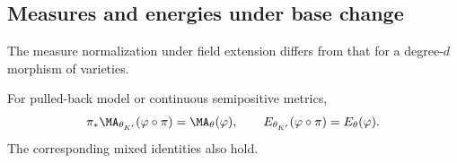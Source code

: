 \subsection{Measures and energies under base change}
\label{sec:ch30-bc-measures}

The measure normalization under field extension differs from that for a
degree-$d$ morphism of varieties.

\begin{theorem}\label{thm:base-change-ma}
For pulled-back model or continuous semipositive metrics,
\begin{equation}
\label{eq:base-change-ma}
 \pi_*\MA_{\theta_{K'}}(\varphi\circ\pi)=\MA_\theta(\varphi),
 \qquad
 E_{\theta_{K'}}(\varphi\circ\pi)=E_\theta(\varphi).
\end{equation}
The corresponding mixed identities also hold.
\end{theorem}

